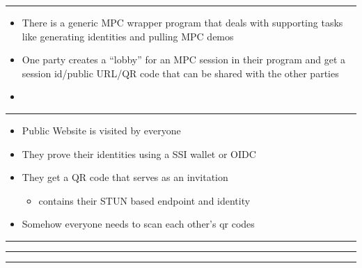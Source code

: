 \begin{center}\rule{0.5\linewidth}{0.5pt}\end{center}

\begin{itemize}
\tightlist
\item
  There is a generic MPC wrapper program that deals with supporting
  tasks like generating identities and pulling MPC demos
\item
  One party creates a ``lobby'' for an MPC session in their program and
  get a session id/public URL/QR code that can be shared with the other
  parties
\item
\end{itemize}

\begin{center}\rule{0.5\linewidth}{0.5pt}\end{center}

\begin{itemize}
\tightlist
\item
  Public Website is visited by everyone
\item
  They prove their identities using a SSI wallet or OIDC
\item
  They get a QR code that serves as an invitation

  \begin{itemize}
  \tightlist
  \item
    contains their STUN based endpoint and identity
  \end{itemize}
\item
  Somehow everyone needs to scan each other's qr codes
\end{itemize}

\begin{center}\rule{0.5\linewidth}{0.5pt}\end{center}

\begin{center}\rule{0.5\linewidth}{0.5pt}\end{center}

\begin{center}\rule{0.5\linewidth}{0.5pt}\end{center}

